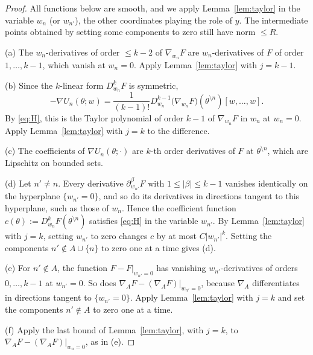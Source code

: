 \documentclass[11pt]{article}
\theoremstyle{definition}
\theoremstyle{remark}
\numberwithin{equation}{section}
\newcommand{\sm}{\setminus}
\begin{document}
\begin{proof}
All functions below are smooth, and we apply Lemma~\ref{lem:taylor} in the variable $w_n$ (or $w_{n'}$), the other coordinates playing the role of $y$. The intermediate points obtained by setting some components to zero still have norm $\le R$.

(a) The $w_n$-derivatives of order $\le k-2$ of $\nabla_{w_n}F$ are $w_n$-derivatives of $F$ of order $1,\dots,k-1$, which vanish at $w_n=0$. Apply Lemma~\ref{lem:taylor} with $j=k-1$.

(b) Since the $k$-linear form $D^k_{w_n}F$ is symmetric,
\[
-\nabla U_n(\theta;w)=\frac{1}{(k-1)!}D^{k-1}_{w_n}\big(\nabla_{w_n}F\big)(\theta^{\sm n})[w,\dots,w].
\]
By \eqref{eq:H}, this is the Taylor polynomial of order $k-1$ of $\nabla_{w_n}F$ in $w_n$ at $w_n=0$. Apply Lemma~\ref{lem:taylor} with $j=k$ to the difference.

(c) The coefficients of $\nabla U_n(\theta;\cdot)$ are $k$-th order derivatives of $F$ at $\theta^{\sm n}$, which are Lipschitz on bounded sets.

(d) Let $n'\neq n$. Every derivative $\partial^\beta_{w_{n'}}F$ with $1\le|\beta|\le k-1$ vanishes identically on the hyperplane $\{w_{n'}=0\}$, and so do its derivatives in directions tangent to this hyperplane, such as those of $w_n$. Hence the coefficient function $c(\theta):=D^k_{w_n}F(\theta^{\sm n})$ satisfies \eqref{eq:H} in the variable $w_{n'}$. By Lemma~\ref{lem:taylor} with $j=k$, setting $w_{n'}$ to zero changes $c$ by at most $C|w_{n'}|^k$. Setting the components $n'\notin A\cup\{n\}$ to zero one at a time gives (d).

(e) For $n'\notin A$, the function $F-F|_{w_{n'}=0}$ has vanishing $w_{n'}$-derivatives of orders $0,\dots,k-1$ at $w_{n'}=0$. So does $\nabla_AF-(\nabla_AF)|_{w_{n'}=0}$, because $\nabla_A$ differentiates in directions tangent to $\{w_{n'}=0\}$. Apply Lemma~\ref{lem:taylor} with $j=k$ and set the components $n'\notin A$ to zero one at a time.

(f) Apply the last bound of Lemma~\ref{lem:taylor}, with $j=k$, to $\nabla_AF-(\nabla_AF)|_{w_n=0}$, as in (e).
\end{proof}
\end{document}
